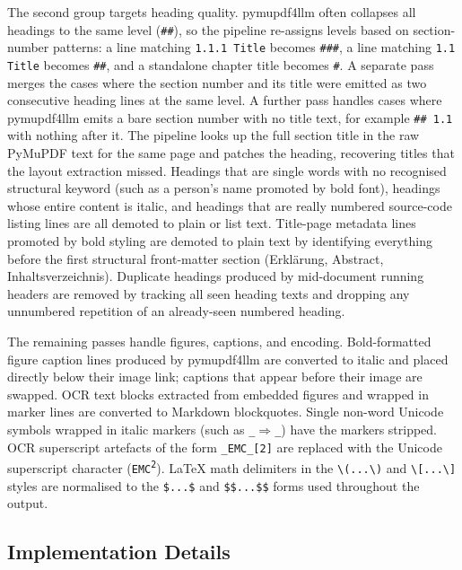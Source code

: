 \documentclass[12pt]{article}
\begin{document}
The second group targets heading quality.
pymupdf4llm often collapses all headings to the same level (\texttt{\#\#}), so the pipeline re-assigns levels based on section-number patterns: a line matching \texttt{1.1.1 Title} becomes \texttt{\#\#\#}, a line matching \texttt{1.1 Title} becomes \texttt{\#\#}, and a standalone chapter title becomes \texttt{\#}.
A separate pass merges the cases where the section number and its title were emitted as two consecutive heading lines at the same level.
A further pass handles cases where pymupdf4llm emits a bare section number with no title text, for example \texttt{\#\# 1.1} with nothing after it. The pipeline looks up the full section title in the raw PyMuPDF text for the same page and patches the heading, recovering titles that the layout extraction missed.
Headings that are single words with no recognised structural keyword (such as a person's name promoted by bold font), headings whose entire content is italic, and headings that are really numbered source-code listing lines are all demoted to plain or list text.
Title-page metadata lines promoted by bold styling are demoted to plain text by identifying everything before the first structural front-matter section (Erklärung, Abstract, Inhaltsverzeichnis).
Duplicate headings produced by mid-document running headers are removed by tracking all seen heading texts and dropping any unnumbered repetition of an already-seen numbered heading.

The remaining passes handle figures, captions, and encoding.
Bold-formatted figure caption lines produced by pymupdf4llm are converted to italic and placed directly below their image link; captions that appear before their image are swapped.
OCR text blocks extracted from embedded figures and wrapped in marker lines are converted to Markdown blockquotes.
Single non-word Unicode symbols wrapped in italic markers (such as \texttt{\_{}$\Rightarrow$\_{}}) have the markers stripped.
OCR superscript artefacts of the form \texttt{\_{}EMC\_{}[2]} are replaced with the Unicode superscript character (\texttt{EMC\textsuperscript{2}}).
LaTeX math delimiters in the \texttt{\textbackslash(...\textbackslash)} and \texttt{\textbackslash[...\textbackslash]} styles are normalised to the \texttt{\$...\$} and \texttt{\$\$...\$\$} forms used throughout the output.

\subsection{Implementation Details}
\end{document}
